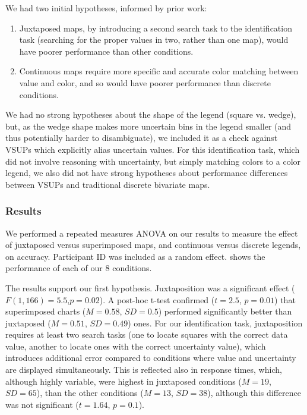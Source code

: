 We had two initial hypotheses, informed by prior work:

\begin{enumerate}
	\item Juxtaposed maps, by introducing a second search task to the identification task (searching for the proper values in two, rather than one map), would have poorer performance than other conditions.
	\item Continuous maps require more specific and accurate color matching between value and color, and so would have poorer performance than discrete conditions.
\end{enumerate}

We had no strong hypotheses about the shape of the legend (square vs. wedge), but, as the wedge shape makes more uncertain bins in the legend smaller (and thus potentially harder to disambiguate), we included it as a check against VSUPs which explicitly alias uncertain values. For this identification task, which did not involve reasoning with uncertainty, but simply matching colors to a color legend, we also did not have strong hypotheses about performance differences between VSUPs and traditional discrete bivariate maps.

\subsubsection{Results}
\taskOneFig

We performed a repeated measures ANOVA on our results to measure the effect of juxtaposed versus superimposed maps, and continuous versus discrete legends, on accuracy. Participant ID was included as a random effect.  shows the performance of each of our 8 conditions.

The results support our first hypothesis. Juxtaposition was a significant effect ($F(1,166)=5.5$,$p=0.02$). A post-hoc t-test confirmed ($t=2.5$, $p=0.01$) that superimposed charts ($M=0.58$, $SD=0.5$) performed significantly better than juxtaposed ($M=0.51$, $SD=0.49$) ones. For our identification task, juxtaposition requires at least two search tasks (one to locate squares with the correct data value, another to locate ones with the correct uncertainty value), which introduces additional error compared to conditions where value and uncertainty are displayed simultaneously. This is reflected also in response times, which, although highly variable, were highest in juxtaposed conditions ($M=19$, $SD=65$), than the other conditions ($M=13$, $SD=38$), although this difference was not significant ($t=1.64$, $p=0.1$).

